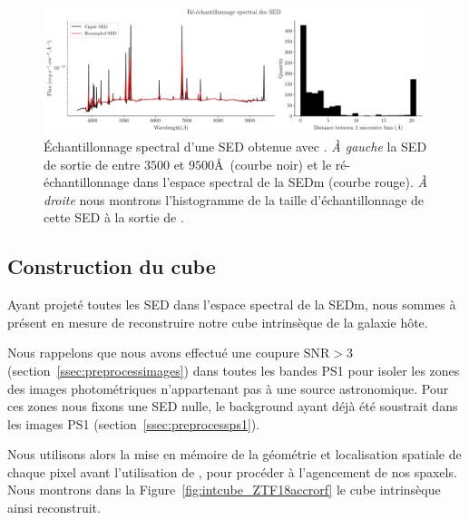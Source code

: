 \documentclass[../main/main.tex]{subfiles}
\begin{document}
\begin{figure}[ht]
  \centering
  \includegraphics[width=0.99\textwidth]{../figures/05_sedfit/cigalesampling.pdf}
  \caption[\'Echantillonnage spectral d'une SED obtenue avec
  \cigale]{\'Echantillonnage spectral d'une SED obtenue avec \cigale. \textit{À
    gauche} la SED de sortie de \cigale entre $3500$ et $9500$\AA\ 
    (courbe noir) et le ré-échantillonnage dans l'espace spectral de la SEDm
    (courbe rouge). \textit{À droite} nous montrons l'histogramme
    de la taille d'échantillonnage de cette SED à la sortie de \cigale.}\label{fig:cigalesampling}
\end{figure}

\subsection{Construction du cube}

Ayant projeté toutes les SED dans l'espace spectral de la SEDm,
nous sommes à présent en mesure de reconstruire notre cube intrinsèque
de la galaxie hôte.

Nous rappelons que nous avons effectué une coupure SNR$>3$ (section~\ref{ssec:preprocessimages}) dans toutes
les bandes PS1 pour isoler les zones des images photométriques
n'appartenant pas à une source astronomique. Pour ces zones nous fixons
une SED nulle, le background ayant déjà été soustrait dans les images
PS1 (section~\ref{ssec:preprocessps1}).

Nous utilisons alors la mise en mémoire de la géométrie et localisation
spatiale de chaque pixel avant l'utilisation de \cigale, pour procéder
à l'agencement de nos spaxels.
Nous montrons dans la Figure~\ref{fig:intcube_ZTF18accrorf} le cube intrinsèque
ainsi reconstruit.
\end{document}
